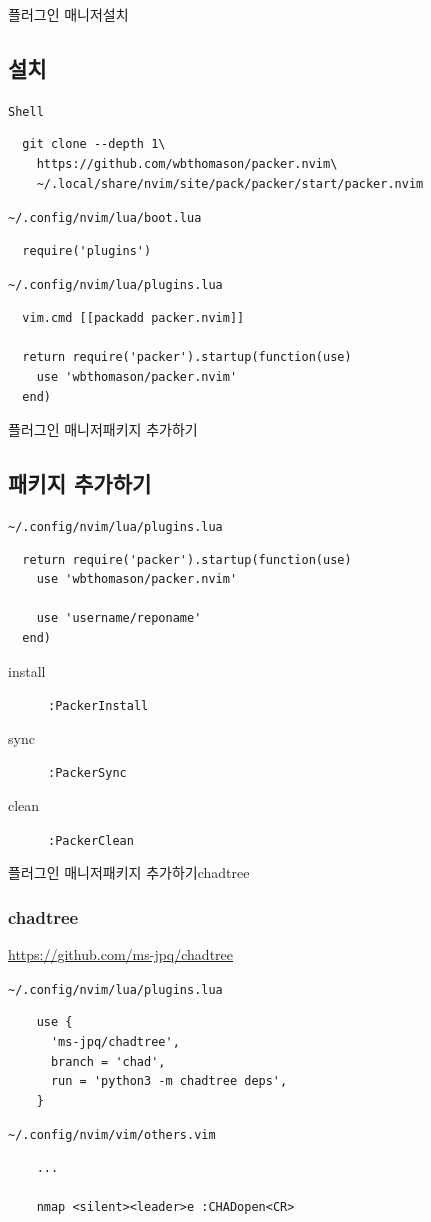 \documentclass[aspectratio=169]{beamer}
\newcommand{\sssframe}[2]{\begin{frame}[containsverbatim]{#1}{#2}\subsection{#2}}
\newcommand{\ssssframe}[3]{\begin{frame}[containsverbatim]{#1}{#2}{#3}\subsubsection{#3}}
\begin{document}
\sssframe{플러그인 매니저}{설치}
  \verb|Shell|

  \begin{verbatim}
  git clone --depth 1\
    https://github.com/wbthomason/packer.nvim\
    ~/.local/share/nvim/site/pack/packer/start/packer.nvim
  \end{verbatim}

  \verb|~/.config/nvim/lua/boot.lua|

  \begin{verbatim}
  require('plugins')
  \end{verbatim}

  \verb|~/.config/nvim/lua/plugins.lua|

  \begin{verbatim}
  vim.cmd [[packadd packer.nvim]]

  return require('packer').startup(function(use)
    use 'wbthomason/packer.nvim'
  end)
  \end{verbatim}
\end{frame}

\sssframe{플러그인 매니저}{패키지 추가하기}
  \verb|~/.config/nvim/lua/plugins.lua|

  \begin{verbatim}
  return require('packer').startup(function(use)
    use 'wbthomason/packer.nvim'

    use 'username/reponame'
  end)
  \end{verbatim}

  \begin{description}
    \item[install] \verb|:PackerInstall|
    \item[sync] \verb|:PackerSync|
    \item[clean] \verb|:PackerClean|
  \end{description}
\end{frame}

\ssssframe{플러그인 매니저}{패키지 추가하기}{chadtree}
  \url{https://github.com/ms-jpq/chadtree}

  \verb|~/.config/nvim/lua/plugins.lua|

  \begin{verbatim}
    use {
      'ms-jpq/chadtree',
      branch = 'chad',
      run = 'python3 -m chadtree deps',
    }
  \end{verbatim}

  \verb|~/.config/nvim/vim/others.vim|

  \begin{verbatim}
    ...

    nmap <silent><leader>e :CHADopen<CR>
  \end{verbatim}
\end{frame}
\end{document}
